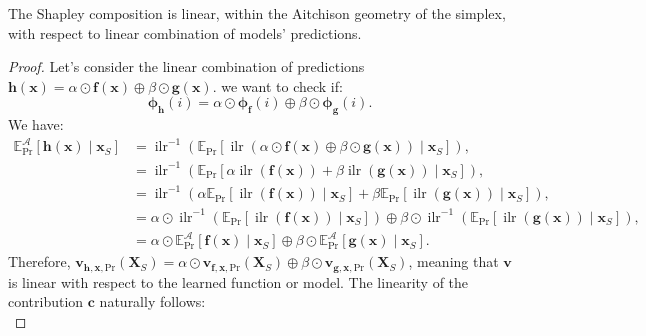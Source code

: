 \documentclass{article}
\theoremstyle{plain}
\theoremstyle{definition}
\theoremstyle{remark}
\DeclareMathOperator{\ilr}{ilr}
\begin{document}
The Shapley composition is linear, within the Aitchison geometry of the simplex, with respect to linear combination of models' predictions.
\begin{proof}
  Let's consider the linear combination of predictions $\bm{h}(\bm{x}) = \alpha \odot \bm{f}(\bm{x}) \oplus \beta \odot \bm{g}(\bm{x})$. we want to check if:
  \begin{equation}
    \label{eq:linearsimplex}
    \bm{\phi}_{\bm{h}}(i) = \alpha \odot \bm{\phi}_{\bm{f}}(i) \oplus \beta\odot \bm{\phi}_{\bm{g}}(i).
  \end{equation}
  We have:
  \begin{equation}
    \begin{aligned}
      \mathbb{E}^{\mathcal{A}}_{\text{Pr}}[\bm{h}(\bm{x})\mid \bm{x}_S] &= \ilr^{-1} \left( \mathbb{E}_{\text{Pr}} [\ilr \left(  \alpha \odot \bm{f}(\bm{x}) \oplus \beta \odot \bm{g}(\bm{x}) \right) \mid \bm{x}_S] \right),\\
                                                                        &= \ilr^{-1} \left( \mathbb{E}_{\text{Pr}} [\alpha \ilr \left( \bm{f}(\bm{x})\right) + \beta \ilr \left( \bm{g}(\bm{x}) \right) \mid \bm{x}_S] \right),\\
                                                                        &= \ilr^{-1} \left( \alpha \mathbb{E}_{\text{Pr}} [ \ilr \left( \bm{f}(\bm{x})\right) \mid \bm{x}_S] + \beta \mathbb{E}_{\text{Pr}} [ \ilr \left( \bm{g}(\bm{x}) \right) \mid \bm{x}_S] \right),\\
                                                                        &= \alpha \odot \ilr^{-1} \left( \mathbb{E}_{\text{Pr}} [ \ilr \left( \bm{f}(\bm{x})\right) \mid \bm{x}_S] \right) \oplus \beta \odot \ilr^{-1} \left( \mathbb{E}_{\text{Pr}} [ \ilr \left( \bm{g}(\bm{x}) \right) \mid \bm{x}_S] \right),\\
                                                                        &= \alpha \odot \mathbb{E}^{\mathcal{A}}_{\text{Pr}}[\bm{f}(\bm{x})\mid \bm{x}_S] \oplus \beta \odot \mathbb{E}^{\mathcal{A}}_{\text{Pr}}[\bm{g}(\bm{x})\mid \bm{x}_S].
    \end{aligned}
  \end{equation}
  Therefore, $\bm{v}_{\bm{h},\bm{x},\text{Pr}}(\bm{X}_S) = \alpha \odot \bm{v}_{\bm{f},\bm{x},\text{Pr}}(\bm{X}_S) \oplus \beta \odot \bm{v}_{\bm{g},\bm{x},\text{Pr}}(\bm{X}_S)$, meaning that $\bm{v}$ is linear with respect to the learned function or model. The linearity of the contribution $\bm{c}$ naturally follows:
  \begin{equation}

\end{equation}
\end{proof}
\end{document}
